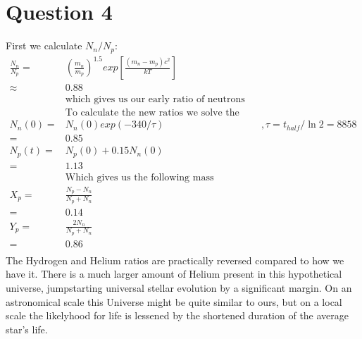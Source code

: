 \documentclass[10pt,a4paper]{article}
\begin{document}
\section*{Question 4}
First we calculate $N_{n}/N_{p}$:
\begin{align*}
	\frac{N_{n}}{N_{p}} =& (\frac{m_{n}}{m_{p}})^{1.5}exp[\frac{(m_{n}-m_{p})c^{2}}{kT}] & \\
	\approx& 0.88 &\\
	&\mbox{which gives us our early ratio of neutrons to protons.}&\\
	&\mbox{To calculate the new ratios we solve the formulas:}&\\
	N_{n}(0) =& N_{n}(0)exp(-340/\tau) &, \tau = t_{half}/ \ln 2=8858 \\
					 =& 0.85 &\\
	N_{p}(t) =& N_{p}(0) + 0.15N_{n}(0) &\\
					 =& 1.13 &\\
	&\mbox{Which gives us the following mass fractions:}&\\
	X_{p} =& \frac{N_{p} - N_{n}}{N_{p} + N_{n}} &\\
				=& 0.14 &\\
	Y_{p} =& \frac{2N_{n}}{N_{p} + N_{n}} &\\
				=& 0.86 &\\
\end{align*}
The Hydrogen and Helium ratios are practically reversed compared to how we have it. There is a much larger amount of Helium present in this hypothetical universe, jumpstarting universal stellar evolution by a significant margin. On an astronomical scale this Universe might be quite similar to ours, but on a local scale the likelyhood for life is lessened by the shortened duration of the average star's life.
\end{document}
